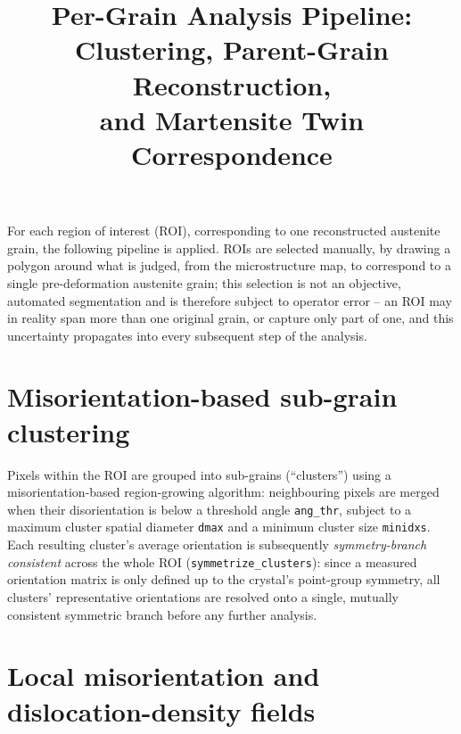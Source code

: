 \documentclass[11pt]{article}
\title{Per-Grain Analysis Pipeline: Clustering, Parent-Grain Reconstruction,\\
and Martensite Twin Correspondence}
\author{}
\date{}
\begin{document}
\maketitle

For each region of interest (ROI), corresponding to one reconstructed
austenite grain, the following pipeline is applied. ROIs are selected
manually, by drawing a polygon around what is judged, from the
microstructure map, to correspond to a single pre-deformation austenite
grain; this selection is not an objective, automated segmentation and is
therefore subject to operator error -- an ROI may in reality span more
than one original grain, or capture only part of one, and this
uncertainty propagates into every subsequent step of the analysis.

\section{Misorientation-based sub-grain clustering}

Pixels within the ROI are grouped into sub-grains (``clusters'') using a
misorientation-based region-growing algorithm: neighbouring pixels are
merged when their disorientation is below a threshold angle
\texttt{ang\_thr}, subject to a maximum cluster spatial diameter
\texttt{dmax} and a minimum cluster size \texttt{minidxs}. Each resulting
cluster's average orientation is subsequently \emph{symmetry-branch
consistent} across the whole ROI (\texttt{symmetrize\_clusters}): since a
measured orientation matrix is only defined up to the crystal's point-group
symmetry, all clusters' representative orientations are resolved onto a
single, mutually consistent symmetric branch before any further analysis.

\section{Local misorientation and dislocation-density fields}
\end{document}
